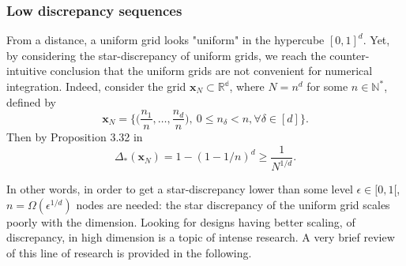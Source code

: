 \documentclass[twoside,11pt]{book}
\newtheorem{theorem}{Theorem}
\numberwithin{theorem}{chapter}
\numberwithin{definition}{chapter}
\numberwithin{proposition}{chapter}
\numberwithin{corollary}{chapter}
\numberwithin{example}{chapter}
\numberwithin{lemma}{chapter}
\numberwithin{assumption}{chapter}
\begin{document}




\subsubsection{Low discrepancy sequences}


From a distance, a uniform grid looks "uniform" in the hypercube $[0,1]^{d}$. Yet, by considering the star-discrepancy of uniform grids, we reach the counter-intuitive conclusion that the uniform grids are not convenient for numerical integration. Indeed, consider the grid $\bm{x}_{N}  \subset \mathbb{R^{d}}$, where $N = n^{d}$ for some $n \in \mathbb{N}^{*}$, defined by
\begin{equation}
\bm{x}_{N} = \bigg\{ \bigg(\frac{n_{1}}{n}, \dots, \frac{n_{d}}{n} \bigg), \: 0 \leq n_{\delta} < n, \forall \delta \in [d] \bigg\}. 
\end{equation}
Then by Proposition 3.32 in \citep{DiPi10}
\begin{equation}
\Delta_{*}(\bm{x}_{N}) = 1- (1-1/n)^{d} \geq \frac{1}{N^{1/d}}. 
\end{equation} 


In other words, in order to get a star-discrepancy lower than some level $\epsilon \in [0,1[$, $n = \Omega(\epsilon^{1/d})$ nodes are needed: the star discrepancy of the uniform grid scales poorly with the dimension. Looking for designs having better scaling, of discrepancy, in high dimension is a topic of intense research.  A very brief review of this line of research is provided in the following. 
 
\end{document}
